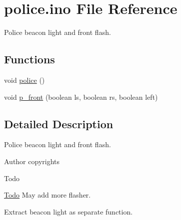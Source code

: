 \hypertarget{police_8ino}{}\section{police.\+ino File Reference}
\label{police_8ino}


Police beacon light and front flash.  


\subsection*{Functions}
{\bf }\par
\begin{DoxyCompactItemize}
\item 
void \hyperlink{group__police_ga55d627c45708bc26866e27d49432eee9}{police} ()
\item 
void \hyperlink{group__police_ga82542db5e1a84d584a1725f36caaf71e}{p\+\_\+front} (boolean ls, boolean rs, boolean left)
\end{DoxyCompactItemize}



\subsection{Detailed Description}
Police beacon light and front flash. 

\begin{DoxyAuthor}{Author}
copyrights 
\end{DoxyAuthor}
\begin{DoxyRefDesc}{Todo}
\item[\hyperlink{todo__todo000003}{Todo}]May add more flasher. 

Extract beacon light as separate function. \end{DoxyRefDesc}
